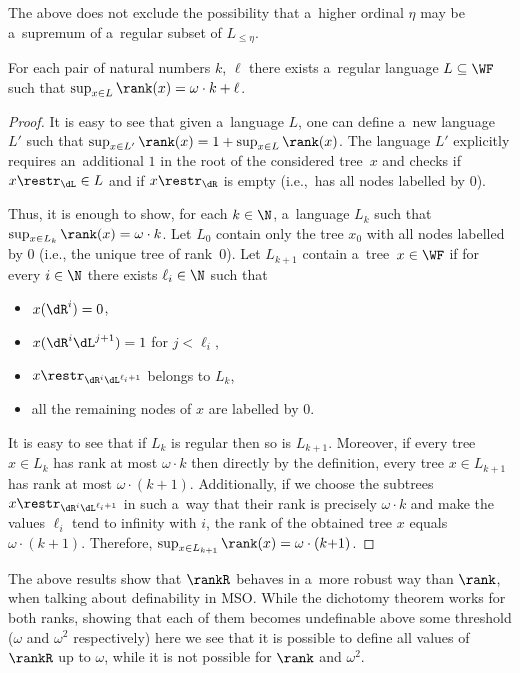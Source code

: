 \documentclass{lmcs}
\numberwithin{equation}{section}
\numberwithin{figure}{section}
\begin{document}
The above  does not exclude the
possibility that a~higher ordinal $\eta$ may be a~supremum of a~regular
subset of $L_{\leq\eta}$.

\begin{lem}\label{lem:construct-ordinals}
	For each pair of natural numbers $k$, $\ell$ there exists a~regular language $L\subseteq\WF$ such that $\sup_{x\in L} \rank(x)=\omega\cdot k+\ell$.
\end{lem}

\begin{proof}
	It is easy to see that given a~language $L$, one can define a~new language $L'$ such that $\sup_{x\in L'}\rank(x)=1+\sup_{x\in L}\rank(x)$.
	The language $L'$ explicitly requires an~additional $1$ in the root of the considered tree~$x$ and checks if $x\restr_\dL\in L$ and if $x\restr_\dR$ is empty (i.e.,~has all nodes labelled by $0$).

	Thus, it is enough to show, for each $k\in\N$, a~language $L_k$ such that $\sup_{x\in L_k}\rank(x)=\omega\cdot k$.
	Let $L_0$ contain only the tree $x_0$ with all nodes labelled by $0$ (i.e., the unique tree of rank~$0$).
	Let $L_{k+1}$ contain a~tree~$x\in \WF$ if for every $i\in\N$ there exists $\ell_i\in\N$ such that
	\begin{itemize}
	\item $x(\dR^i)=0$,
	\item $x(\dR^i\dL^{j+1})=1$ for $j<\ell_i$,
	\item $x\restr_{\dR^i\dL^{\ell_i+1}}$ belongs to $L_k$,
	\item all the remaining nodes of $x$ are labelled by $0$.
	\end{itemize}
	It is easy to see that if $L_k$ is regular then so is $L_{k+1}$.
	Moreover, if every tree $x\in L_k$ has rank at most $\omega\cdot k$ then directly by the definition, every tree $x\in L_{k+1}$ has rank at most $\omega\cdot (k{+}1)$.
	Additionally, if we choose the subtrees $x\restr_{\dR^i\dL^{\ell_i+1}}$ in such a~way that their rank is precisely $\omega\cdot k$ and make the values $\ell_i$ tend to infinity with $i$,
	the rank of the obtained tree $x$ equals $\omega\cdot (k{+}1)$.
	Therefore, $\sup_{x\in L_{k+1}}\rank(x)=\omega\cdot (k{+}1)$.
\end{proof}

The above results show that $\rankR$ behaves in a~more robust way than $\rank$, when talking about definability in MSO.
While the dichotomy theorem works for both ranks, showing that each of them becomes undefinable above some threshold ($\omega$ and $\omega^2$ respectively)
here we see that it is possible to define all values of $\rankR$ up to $\omega$, while it is not possible for $\rank$ and $\omega^2$.
\end{document}
